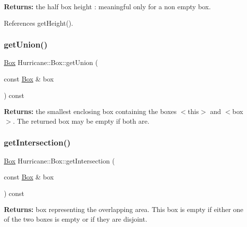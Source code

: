 {\bfseries Returns\+:} the half box height \+: meaningful only for a non empty box. 

References get\+Height().

\mbox{\label{classHurricane_1_1Box_a2670058f109dfae32d284db249e533bc}} 
\subsubsection{\texorpdfstring{get\+Union()}{getUnion()}}
{\footnotesize\ttfamily \mbox{\hyperlink{classHurricane_1_1Box}{Box}} Hurricane\+::\+Box\+::get\+Union (\begin{DoxyParamCaption}\item[{const \mbox{\hyperlink{classHurricane_1_1Box}{Box}} \&}]{box }\end{DoxyParamCaption}) const}

{\bfseries Returns\+:} the smallest enclosing box containing the boxes {\ttfamily $<$this$>$} and {\ttfamily $<$box$>$}. The returned box may be empty if both are. \mbox{\label{classHurricane_1_1Box_a610f9c63bc5636ef304f4768215ffb12}} 
\subsubsection{\texorpdfstring{get\+Intersection()}{getIntersection()}}
{\footnotesize\ttfamily \mbox{\hyperlink{classHurricane_1_1Box}{Box}} Hurricane\+::\+Box\+::get\+Intersection (\begin{DoxyParamCaption}\item[{const \mbox{\hyperlink{classHurricane_1_1Box}{Box}} \&}]{box }\end{DoxyParamCaption}) const}

{\bfseries Returns\+:} box representing the overlapping area. This box is empty if either one of the two boxes is empty or if they are disjoint. \mbox{\label{classHurricane_1_1Box_af8b269603b5c173891a484214ca50266}} 
